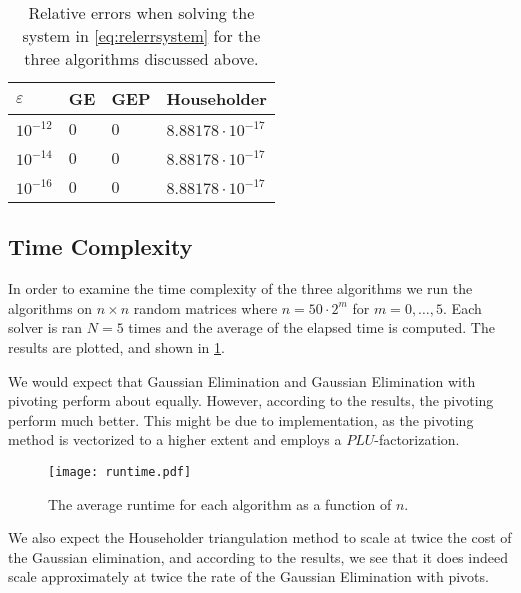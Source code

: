 \documentclass[oneside, a4paper, 12pt, article]{memoir}
\begin{document}
    \begin{table}[htbp]
        \centering
        \renewcommand{\arraystretch}{1.3}
        \begin{tabular}{@{}llll@{}}
            \toprule
            \(\varepsilon\) & GE  & GEP & Householder \\
            \midrule
            \(10^{-12}\) & 0& 0& \(8.88178\cdot10^{-17}\)\\
            \(10^{-14}\) & 0& 0& \(8.88178\cdot10^{-17}\)\\
            \(10^{-16}\) & 0& 0& \(8.88178\cdot10^{-17}\)\\
            \bottomrule
        \end{tabular} 
        \caption{Relative errors when solving the system in
        \cref{eq:relerrsystem} for the three algorithms discussed above.}
        \label{tab:relative_error}
    \end{table}

    \subsection{Time Complexity}
    
    In order to examine the time complexity of the three algorithms we run the
    algorithms on \( n \times n \) random matrices where \( n = 50 \cdot 2^m
    \) for \( m = 0, \ldots, 5 \). Each solver is ran \( N = 5\) times and the
    average of the elapsed time is computed. The results are plotted, and
    shown in \cref{fig:time_complexity}. 
    
    We would expect that Gaussian Elimination and Gaussian Elimination with
    pivoting perform about equally. However, according to the results, the
    pivoting perform much better. This might be due to implementation, as the
    pivoting method is vectorized to a higher extent and employs a \( PLU
    \)-factorization.

    \begin{figure}[htbp]
        \centering
        \texttt{[image: runtime.pdf]}
        \caption{The average runtime for each algorithm as a function of \( n \).}
        \label{fig:time_complexity}
    \end{figure}
    
    We also expect the Householder triangulation method to scale at twice the
    cost of the Gaussian elimination, and according to the results, we see
    that it does indeed scale approximately at twice the rate of the Gaussian
    Elimination with pivots.
    
\end{document}
